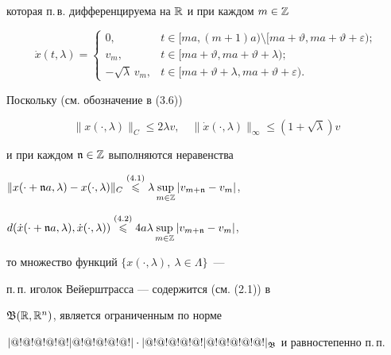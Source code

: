 которая п.\,в. дифференцируема на $\Bbb R$ и при каждом $m\in\Bbb Z$


\begin{equation}


\Dot x(t,\lambda)=\begin{cases}


0, &t\in [ma,(m+1)a) \setminus


[ma+\vartheta,ma+\vartheta+\varepsilon); \\


v_m, & t\in[ma+\vartheta,ma+\vartheta+\lambda);\\


-\sqrt{\lambda}\, v_m, & t\in


[ma+\vartheta+\lambda,ma+\vartheta+\varepsilon).


\end{cases}


\end{equation}





Поскольку (см. обозначение в (3.6))


\begin{equation}


\|x(\cdot,\lambda)\|_{C}\leqslant2\lambda v,\quad \|\dot


x(\cdot,\lambda)\|_{\infty}\leqslant(1+\sqrt{\lambda})v


\end{equation}


и при каждом ${\frak n}\in{\Bbb Z}$ выполняются неравенства


$\|x(\cdot+\frak n a,\lambda)-


x(\cdot,\lambda)\|_C\up{(4.1)}{\leqslant}{}\lambda


\sup\limits_{m\in{\Bbb Z}}|v_{m+\frak n}-v_m|$,


$d(\Dot x(\cdot+\frak n a,\lambda),\Dot


x(\cdot,\lambda))\up{(4.2)}{\leqslant}{}4a\lambda


\sup\limits_{m\in{\Bbb Z}}|v_{m+{\frak n}}-v_m|$,


то множество функций $\{x(\cdot,\lambda),\ \lambda\in\Lambda\}$~---


п.\,п. иголок Вейерштрасса --- содержится (см. (2.1)) в


$\frak B(\Bbb R,\Bbb R^n)$, является ограниченным по норме


$|@!@!@!@!@!|@!@!@!@!@!|\cdot|@!@!@!@!@!|@!@!@!@!@!|_{\frak B}$ и равностепенно п.\,п.





